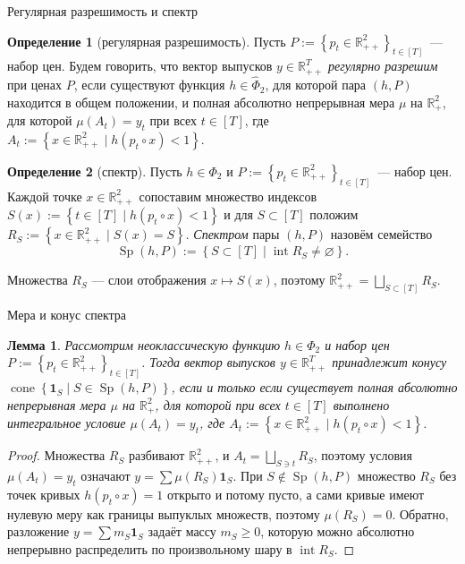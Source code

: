 \documentclass[10pt,aspectratio=169]{beamer}
\theoremstyle{plain}
\newtheorem{lem}{Лемма}
\theoremstyle{definition}
\newtheorem{defn}{Определение}
\newcommand{\R}{\mathbb{R}}
\newcommand{\set}[1]{\left\{ #1 \right\}}
\newcommand{\Rpp}[1][2]{\R^{#1}_{++}}
\newcommand{\Rp}[1][2]{\R^{#1}_{+}}
\DeclareMathOperator{\cone}{cone}
\DeclareMathOperator{\interior}{int}
\DeclareMathOperator{\Sp}{Sp}
\newcommand{\PhiHat}{\hat{\Phi}}
\begin{document}
\begin{frame}{Регулярная разрешимость и спектр}
    \begin{defn}[регулярная разрешимость]
        Пусть $P:=\set{p_t\in\Rpp}_{t\in[T]}$~--- набор цен. Будем говорить, что вектор выпусков $y\in\Rpp[T]$ \emph{регулярно разрешим} при ценах $P$, если существуют функция $h\in\PhiHat_2$, для которой пара $(h,P)$ находится в общем положении, и полная абсолютно непрерывная мера $\mu$ на $\Rp$, для которой $\mu(A_t)=y_t$ при всех $t\in[T]$, где $A_t:=\set{x\in\Rpp\mid h(p_t\circ x)<1}$.
    \end{defn}

    \begin{defn}[спектр]\label{def:spectrum}
        Пусть $h\in\Phi_2$ и $P:=\set{p_t\in\Rpp}_{t\in[T]}$~--- набор цен. Каждой точке $x\in\Rpp$ сопоставим множество индексов $S(x):=\set{t\in[T]\mid h(p_t\circ x)<1}$ и для $S\subset[T]$ положим $R_S:=\set{x\in\Rpp\mid S(x)=S}$. \emph{Спектром} пары $(h,P)$ назовём семейство
        \[
            \Sp(h,P):=\set{S\subset[T]\mid\interior R_S\neq\varnothing}.
        \]
    \end{defn}

    Множества $R_S$ --- слои отображения $x\mapsto S(x)$, поэтому $\Rpp=\bigsqcup\limits_{S\subset[T]}R_S$.
\end{frame}

\begin{frame}{Мера и конус спектра}
    \begin{lem}\label{lem:cone}
        Рассмотрим неоклассическую функцию $h\in\Phi_2$ и набор цен $P:=\set{p_t\in\Rpp}_{t\in[T]}$. Тогда вектор выпусков $y\in\Rpp[T]$ принадлежит конусу $\cone\set{\mathbf 1_S\mid S\in\Sp(h,P)}$, если и только если существует полная абсолютно непрерывная мера $\mu$ на $\Rp$, для которой при всех $t\in[T]$ выполнено интегральное условие $\mu(A_t)=y_t$, где $A_t:=\set{x\in\Rpp\mid h(p_t\circ x)<1}$.
    \end{lem}

    \begin{proof}
        Множества $R_S$ разбивают $\Rpp$, и $A_t=\bigsqcup_{S\ni t}R_S$, поэтому условия $\mu(A_t)=y_t$ означают $y=\sum\mu(R_S)\mathbf 1_S$. При $S\notin\Sp(h,P)$ множество $R_S$ без точек кривых $h(p_t\circ x)=1$ открыто и потому пусто, а сами кривые имеют нулевую меру как границы выпуклых множеств, поэтому $\mu(R_S)=0$. Обратно, разложение $y=\sum m_S\mathbf 1_S$ задаёт массу $m_S\ge0$, которую можно абсолютно непрерывно распределить по произвольному шару в $\interior R_S$.
    \end{proof}
\end{frame}
\end{document}
